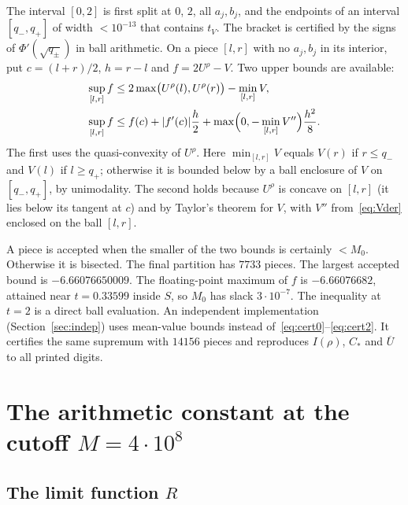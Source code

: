 \documentclass[11pt]{article}
\theoremstyle{remark}
\newcommand{\Ubar}{\overline{U}}
\newcommand{\Cstar}{C_{*}}
\begin{document}
The interval $[0,2]$ is first split at $0$, $2$, all $a_j,b_j$, and the endpoints of an interval $[q_-,q_+]$ of width $<10^{-13}$ that contains $t_V$. The bracket is certified by the signs of $\Phi'(\sqrt{q_\pm})$ in ball arithmetic. On a piece $[l,r]$ with no $a_j,b_j$ in its interior, put $c=(l+r)/2$, $h=r-l$ and $f=2U^\rho-V$. Two upper bounds are available:
\begin{align}
\sup_{[l,r]}f&\le2\max\bigl(U^\rho(l),U^\rho(r)\bigr)-\min_{[l,r]}V,\label{eq:cert0}\\
\sup_{[l,r]}f&\le f(c)+|f'(c)|\frac h2+\max\Bigl(0,-\min_{[l,r]}V''\Bigr)\frac{h^2}{8}.\label{eq:cert2}
\end{align}
The first uses the quasi-convexity of $U^\rho$. Here $\min_{[l,r]}V$ equals $V(r)$ if $r\le q_-$ and $V(l)$ if $l\ge q_+$; otherwise it is bounded below by a ball enclosure of $V$ on $[q_-,q_+]$, by unimodality. The second holds because $U^\rho$ is concave on $[l,r]$ (it lies below its tangent at $c$) and by Taylor's theorem for $V$, with $V''$ from~\eqref{eq:Vder} enclosed on the ball $[l,r]$.

A piece is accepted when the smaller of the two bounds is certainly $<M_0$. Otherwise it is bisected. The final partition has $7733$ pieces. The largest accepted bound is $-6.66076650009$. The floating-point maximum of $f$ is $-6.66076682$, attained near $t=0.33599$ inside $S$, so $M_0$ has slack $3\cdot10^{-7}$. The inequality at $t=2$ is a direct ball evaluation. An independent implementation (Section~\ref{sec:indep}) uses mean-value bounds instead of~\eqref{eq:cert0}--\eqref{eq:cert2}. It certifies the same supremum with $14156$ pieces and reproduces $I(\rho)$, $\Cstar$ and $\Ubar$ to all printed digits.

\section{The arithmetic constant at the cutoff $M=4\cdot10^8$}\label{sec:arith}

\subsection{The limit function $R$}
\end{document}
